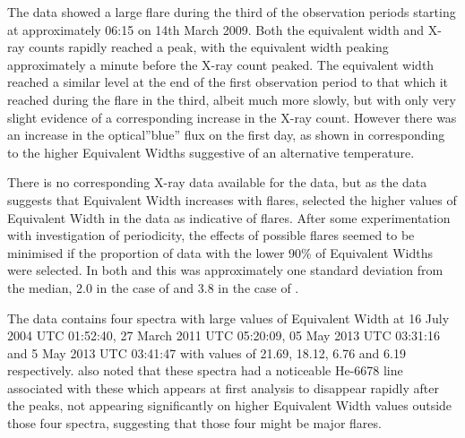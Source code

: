 The {\uves} data showed a large flare during the third of the observation periods starting at approximately 06:15 on
14th March 2009. Both the equivalent width and X-ray counts rapidly reached a peak, with the equivalent width peaking
approximately a minute before the X-ray count peaked. The equivalent width reached a similar level at the end of the
first observation period to that which it reached during the flare in the third, albeit much more slowly, but with only
very slight evidence of a corresponding increase in the X-ray count. However there was an increase in the {\uves}
optical''blue'' flux on the first day, as shown in \citet[fig. 1]{fuhrmeister11} corresponding to the higher Equivalent
Widths suggestive of an alternative temperature.

There is no corresponding X-ray data available for the {\harps} data, but as the {\uves} data suggests that {\ha}
Equivalent Width increases with flares, {\Firstp} selected the higher values of Equivalent Width in the {\harps} data as
indicative of flares. After some experimentation with investigation of periodicity, the effects of possible flares seemed to be
minimised if the proportion of data with the lower 90\% of Equivalent Widths were selected. In both {\uves} and {\harps}
this was approximately one standard deviation from the median, 2.0 in the case of {\uves} and 3.8 in the case of
{\harps}.

The {\harps} data contains four spectra with large values of Equivalent Width at 16 July 2004 UTC 01:52:40, 27 March
2011 UTC 05:20:09, 05 May 2013 UTC 03:31:16 and 5 May 2013 UTC 03:41:47 with values of 21.69, 18.12, 6.76 and 6.19
respectively.  {\FirstP} also noted that these spectra had a noticeable He-6678 line associated with these which appears
at first analysis to disappear rapidly after the peaks, not appearing significantly on higher {\ha} Equivalent Width
values outside those four spectra, suggesting that those four might be major flares.

\begin{table}[!htbp]
\centering
{}
\caption{The seven spectra with Equivalent Widths over 6, in descending order.}
\protect\label{table:excessews}
\end{table}

